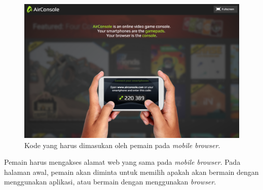 \documentclass[a4paper,twoside]{article}
\begin{document}
\begin{enumerate}
		\begin{figure}[H]
			\centering
			\includegraphics[scale=0.3]{Gambar/con2_code1}
			\caption{Kode yang harus dimasukan oleh pemain pada \textit{mobile browser}.}
			\label{fig:17_con2_code1}
		\end{figure}
		
		Pemain harus mengakses alamat web yang sama pada \textit{mobile browser}. Pada halaman awal, pemain akan diminta untuk memilih apakah akan bermain dengan menggunakan aplikasi, atau bermain dengan menggunakan \textit{browser}. 
		

\end{enumerate}
\end{document}
